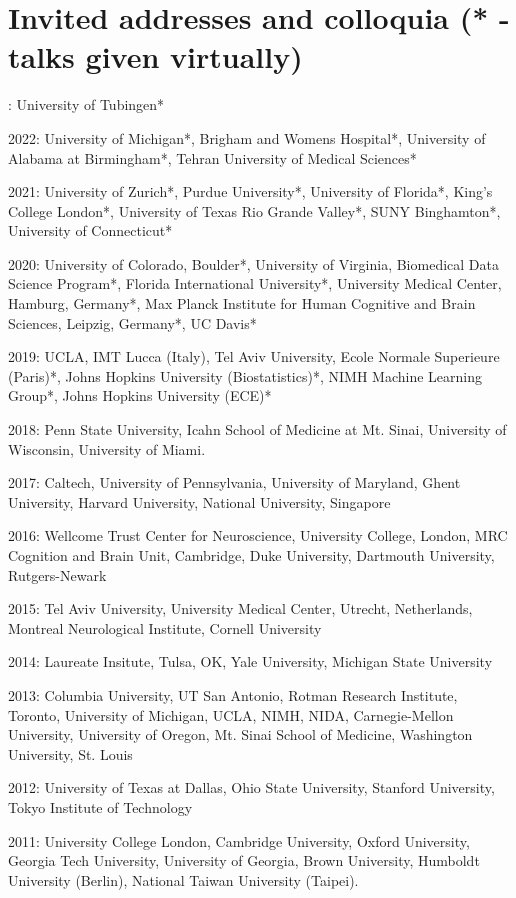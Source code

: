 \documentclass[10pt, letterpaper]{article}
\begin{document}
\section*{Invited addresses and colloquia (* - talks given virtually)}
: University of Tubingen*

2022: University of Michigan*, Brigham and Womens Hospital*, University of Alabama at Birmingham*, Tehran University of Medical Sciences*

2021: University of Zurich*, Purdue University*, University of Florida*, King's College London*, University of Texas Rio Grande Valley*, SUNY Binghamton*, University of Connecticut*

2020: University of Colorado, Boulder*, University of Virginia, Biomedical Data Science Program*, Florida International University*, University Medical Center, Hamburg, Germany*, Max Planck Institute for Human Cognitive and Brain Sciences, Leipzig, Germany*,  UC Davis*

2019:  UCLA,  IMT Lucca (Italy),  Tel Aviv University,  Ecole Normale Superieure (Paris)*,  Johns Hopkins University (Biostatistics)*,   NIMH Machine Learning Group*,  Johns Hopkins University (ECE)* 

2018:  Penn State University,  Icahn School of Medicine at Mt. Sinai,  University of Wisconsin,  University of Miami. 

2017:  Caltech,  University of Pennsylvania,  University of Maryland,  Ghent University,  Harvard University,  National University, Singapore 

2016:  Wellcome Trust Center for Neuroscience, University College, London,  MRC Cognition and Brain Unit, Cambridge,  Duke University,  Dartmouth University,  Rutgers-Newark 

2015:  Tel Aviv University,  University Medical Center, Utrecht, Netherlands,  Montreal Neurological Institute,  Cornell University 

2014:  Laureate Insitute, Tulsa, OK,  Yale University,  Michigan State University 

2013:  Columbia University,  UT San Antonio,  Rotman Research Institute, Toronto,  University of Michigan,  UCLA,  NIMH,  NIDA,  Carnegie-Mellon University,  University of Oregon,  Mt. Sinai School of Medicine,  Washington University, St. Louis

2012:  University of Texas at Dallas,  Ohio State University,  Stanford University,  Tokyo Institute of Technology

2011:  University College London,  Cambridge University,  Oxford University,  Georgia Tech University,  University of Georgia,  Brown University,  Humboldt University (Berlin),  National Taiwan University (Taipei).
\end{document}
